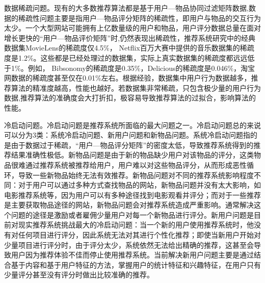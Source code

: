	数据稀疏问题。现有的大多数推荐算法都是基于用户—物品协同过滤矩阵数据,数据的稀疏性问题主要是指用户—物品评分矩阵的稀疏性，即用户与物品的交互行为太少。一个大型网站可能拥有上亿数量级的用户和物品，用户评分数据总量在面对增长更快的“用户—物品评价矩阵”时,仍然表现出稀疏性，推荐系统研究中的经典数据集MovieLens的稀疏度仅4.5\%， Netflix百万大赛中提供的音乐数据集的稀疏度是1.2\%。这些都是已经处理过的数据集，实际上真实数据集的稀疏度都远远低于1\%。例如， Bibsonomy的稀疏度是0.35\%，Delicious的稀疏度是0.046\%，淘宝网数据的稀疏度甚至仅在0.01\%左右。根据经验，数据集中用户行为数据越多，推荐算法的精准度越高，性能也越好。若数据集非常稀疏，只包含极少量的用户行为数据,推荐算法的准确度会大打折扣，极容易导致推荐算法的过拟合，影响算法的性能。

	冷启动问题。冷启动问题是推荐系统所面临的最大问题之一。冷启动问题总的来说可以分为3类：系统冷启动问题、新用户问题和新物品问题。系统冷启动问题指的是由于数据过于稀疏，“用户—物品评分矩阵”的密度太低，导致推荐系统得到的推荐结果准确性极低。新物品问题是由于新的物品缺少用户对该物品的评分，这类物品很难通过推荐系统被推荐给用户，用户难以对这些物品评分，从而形成恶性循环，导致一些新物品始终无法有效推荐。新物品问题对不同的推荐系统影响程度不同：对于用户可以通过多种方式查找物品的网站，新物品问题并没有太大影响，如电影推荐系统等，因为用户可以有多种途径找到电影观看并评分；而对于一些推荐是主要获取物品途径的网站，新物品问题会对推荐系统造成严重影响。通常解决这个问题的途径是激励或者雇佣少量用户对每一个新物品进行评分。新用户问题是目前对现实推荐系统挑战最大的冷启动问题：当一个新的用户使用推荐系统时，他没有对任何项目进行评分，因此系统无法对其进行个性化推荐；即使当新用户开始对少量项目进行评分时，由于评分太少，系统依然无法给出精确的推荐，这甚至会导致用户因为推荐体验不佳而停止使用推荐系统。当前解决新用户问题主要是通过结合基于内容和基于用户特征的方法，掌握用户的统计特征和兴趣特征，在用户只有少量评分甚至没有评分时做出比较准确的推荐。

